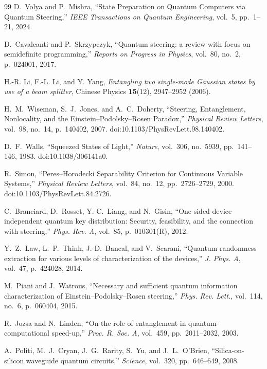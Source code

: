 \begin{thebibliography}{99}
	D.~Volya and P.~Mishra,
	``State Preparation on Quantum Computers via Quantum Steering,''
	\textit{IEEE Transactions on Quantum Engineering},
	vol.~5, pp.~1--21, 2024.
	
	
	D.~Cavalcanti and P.~Skrzypczyk,
	``Quantum steering: a review with focus on semidefinite programming,''
	\textit{Reports on Progress in Physics},
	vol.~80, no.~2, p.~024001, 2017.
	
	H.-R. Li, F.-L. Li, and Y. Yang,
	\textit{Entangling two single-mode Gaussian states by use of a beam splitter},
	Chinese Physics \textbf{15}(12), 2947--2952 (2006).
	
	H.~M.~Wiseman, S.~J.~Jones, and A.~C.~Doherty,
	``Steering, Entanglement, Nonlocality, and the Einstein--Podolsky--Rosen Paradox,''
	\textit{Physical Review Letters},
	vol.~98, no.~14, p.~140402, 2007.
	doi:10.1103/PhysRevLett.98.140402.
	
	D.~F.~Walls,
	``Squeezed States of Light,''
	\textit{Nature},
	vol.~306, no.~5939, pp.~141--146, 1983.
	doi:10.1038/306141a0.
	
	R.~Simon,
	``Peres--Horodecki Separability Criterion for Continuous Variable Systems,''
	\textit{Physical Review Letters},
	vol.~84, no.~12, pp.~2726--2729, 2000.
	doi:10.1103/PhysRevLett.84.2726.
	
	C.~Branciard, D.~Rosset, Y.-C.~Liang, and N.~Gisin,
	``One-sided device-independent quantum key distribution: Security, feasibility, and the connection with steering,''
	\textit{Phys. Rev. A}, vol.~85, p.~010301(R), 2012.
	
	Y.~Z.~Law, L.~P.~Thinh, J.-D.~Bancal, and V.~Scarani,
	``Quantum randomness extraction for various levels of characterization of the devices,''
	\textit{J. Phys. A}, vol.~47, p.~424028, 2014.
	
	M.~Piani and J.~Watrous,
	``Necessary and sufficient quantum information characterization of Einstein--Podolsky--Rosen steering,''
	\textit{Phys. Rev. Lett.}, vol.~114, no.~6, p.~060404, 2015.
	
	R.~Jozsa and N.~Linden,
	``On the role of entanglement in quantum-computational speed-up,''
	\textit{Proc. R. Soc. A}, vol.~459, pp.~2011--2032, 2003.
	
	A.~Politi, M.~J.~Cryan, J.~G.~Rarity, S.~Yu, and J.~L.~O'Brien,
	``Silica-on-silicon waveguide quantum circuits,''
	\textit{Science}, vol.~320, pp.~646--649, 2008.
	

\end{thebibliography}
